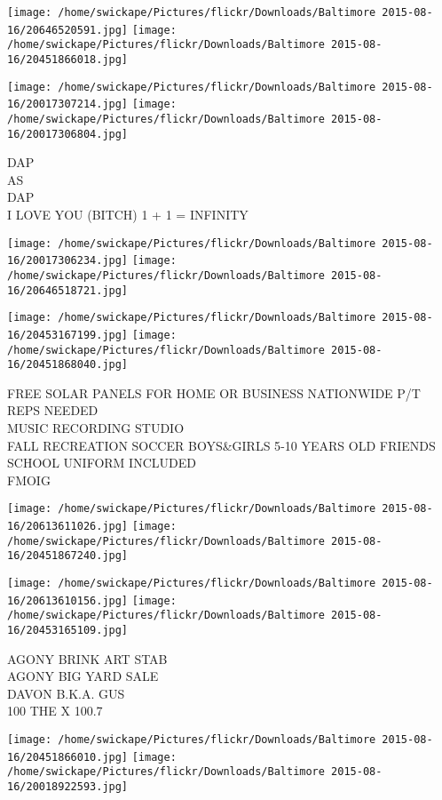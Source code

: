 \documentclass[10pt,letterpaper]{article}
\begin{document}
\texttt{[image: /home/swickape/Pictures/flickr/Downloads/Baltimore 2015-08-16/20646520591.jpg]}
\texttt{[image: /home/swickape/Pictures/flickr/Downloads/Baltimore 2015-08-16/20451866018.jpg]}

\texttt{[image: /home/swickape/Pictures/flickr/Downloads/Baltimore 2015-08-16/20017307214.jpg]}
\texttt{[image: /home/swickape/Pictures/flickr/Downloads/Baltimore 2015-08-16/20017306804.jpg]}

DAP\\
AS\\
DAP\\
I LOVE YOU (BITCH) 1 + 1 = INFINITY
\pagebreak

\texttt{[image: /home/swickape/Pictures/flickr/Downloads/Baltimore 2015-08-16/20017306234.jpg]}
\texttt{[image: /home/swickape/Pictures/flickr/Downloads/Baltimore 2015-08-16/20646518721.jpg]}

\texttt{[image: /home/swickape/Pictures/flickr/Downloads/Baltimore 2015-08-16/20453167199.jpg]}
\texttt{[image: /home/swickape/Pictures/flickr/Downloads/Baltimore 2015-08-16/20451868040.jpg]}

FREE SOLAR PANELS FOR HOME OR BUSINESS NATIONWIDE P/T REPS NEEDED\\
MUSIC RECORDING STUDIO\\
FALL RECREATION SOCCER BOYS\&GIRLS 5{-}10 YEARS OLD FRIENDS SCHOOL UNIFORM INCLUDED\\
FMOIG
\pagebreak

\texttt{[image: /home/swickape/Pictures/flickr/Downloads/Baltimore 2015-08-16/20613611026.jpg]}
\texttt{[image: /home/swickape/Pictures/flickr/Downloads/Baltimore 2015-08-16/20451867240.jpg]}

\texttt{[image: /home/swickape/Pictures/flickr/Downloads/Baltimore 2015-08-16/20613610156.jpg]}
\texttt{[image: /home/swickape/Pictures/flickr/Downloads/Baltimore 2015-08-16/20453165109.jpg]}

AGONY BRINK ART STAB\\
AGONY BIG YARD SALE\\
DAVON B.K.A. GUS\\
100 THE X 100.7
\pagebreak

\texttt{[image: /home/swickape/Pictures/flickr/Downloads/Baltimore 2015-08-16/20451866010.jpg]}
\texttt{[image: /home/swickape/Pictures/flickr/Downloads/Baltimore 2015-08-16/20018922593.jpg]}
\end{document}
